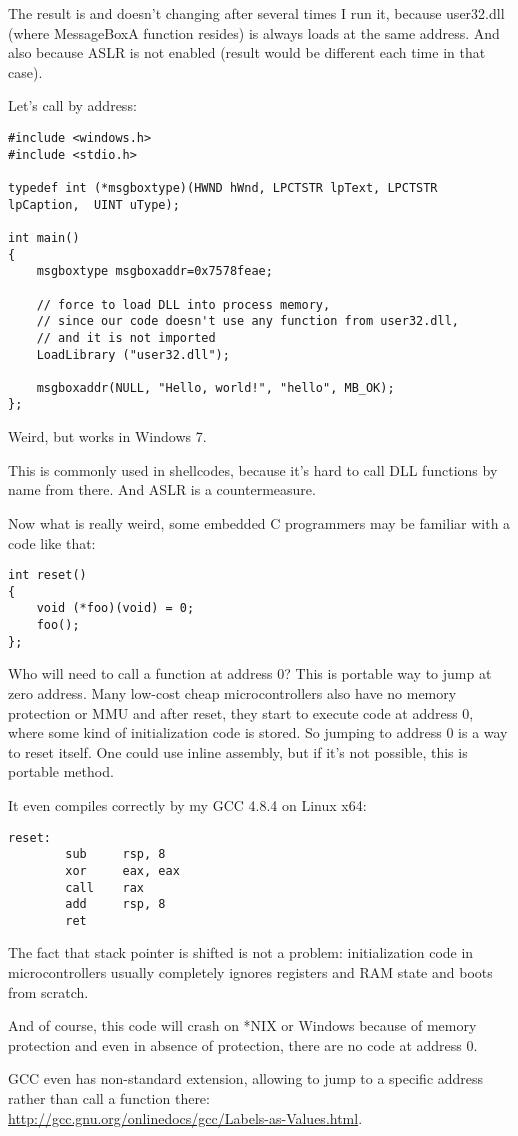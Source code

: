 The result is  and doesn't changing after several times I run it,
because user32.dll (where MessageBoxA function resides) is always loads at the same address.
And also because \ac{ASLR} is not enabled (result would be different each time in that case).

Let's call  by address:

\begin{lstlisting}
#include <windows.h>
#include <stdio.h>

typedef int (*msgboxtype)(HWND hWnd, LPCTSTR lpText, LPCTSTR lpCaption,  UINT uType);

int main()
{
	msgboxtype msgboxaddr=0x7578feae;

	// force to load DLL into process memory, 
	// since our code doesn't use any function from user32.dll, 
	// and it is not imported
	LoadLibrary ("user32.dll");

	msgboxaddr(NULL, "Hello, world!", "hello", MB_OK);
};
\end{lstlisting}

Weird, but works in Windows 7.

This is commonly used in shellcodes, because it's hard to call DLL functions by name from there.
And \ac{ASLR} is a countermeasure.

Now what is really weird, some embedded C programmers may be familiar with a code like that:

\begin{lstlisting}
int reset()
{
	void (*foo)(void) = 0;
	foo();
};
\end{lstlisting}

Who will need to call a function at address 0?
This is portable way to jump at zero address.
Many low-cost cheap microcontrollers also have no memory protection or \ac{MMU} and after reset, they start to execute code at address 0, where some kind of initialization code is stored.
So jumping to address 0 is a way to reset itself.
One could use inline assembly, but if it's not possible, this is portable method.

It even compiles correctly by my GCC 4.8.4 on Linux x64:

\begin{lstlisting}
reset:
        sub     rsp, 8
        xor     eax, eax
        call    rax
        add     rsp, 8
        ret
\end{lstlisting}

The fact that stack pointer is shifted is not a problem: initialization code in microcontrollers usually completely ignores registers and RAM state and boots from scratch.

And of course, this code will crash on *NIX or Windows because of memory protection and even in absence of protection, there are no code at address 0.

GCC even has non-standard extension, allowing to jump to a specific address rather than call a function there:\\
\url{http://gcc.gnu.org/onlinedocs/gcc/Labels-as-Values.html}.

